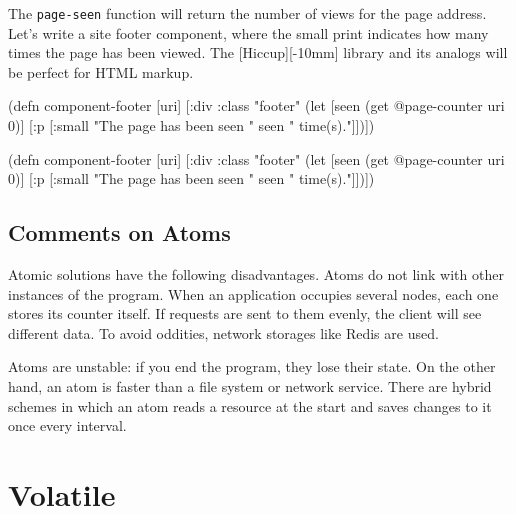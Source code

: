 
The \verb|page-seen| function will return the number of views for the page address.
Let's write a site footer component, where the small print indicates how many times the page has been viewed. The [Hiccup][-10mm] library and its analogs will be perfect for HTML markup.

\ifx\DEVICETYPE\MOBILE

\begin{english}
  \begin{clojure}
(defn component-footer [uri]
  [:div {:class "footer"}
   (let [seen (get @page-counter uri 0)]
     [:p [:small
          "The page has been seen " seen
          " time(s)."]])])
  \end{clojure}
\end{english}

\else

\begin{english}
  \begin{clojure}
(defn component-footer [uri]
  [:div {:class "footer"}
   (let [seen (get @page-counter uri 0)]
     [:p [:small "The page has been seen " seen " time(s)."]])])
  \end{clojure}
\end{english}

\fi

\subsection{Comments on Atoms}

Atomic solutions have the following disadvantages.  
Atoms do not link with other instances of the program. When an application occupies several nodes, each one stores its counter itself.
If requests are sent to them evenly, the client will see different data.
To avoid oddities, network storages like Redis are used.


Atoms are unstable: if you end the program, they lose their state.
On the other hand, an atom is faster than a file system or network service.
There are hybrid schemes in which an atom reads a resource at the start and saves changes to it once every interval.

\section{Volatile}

